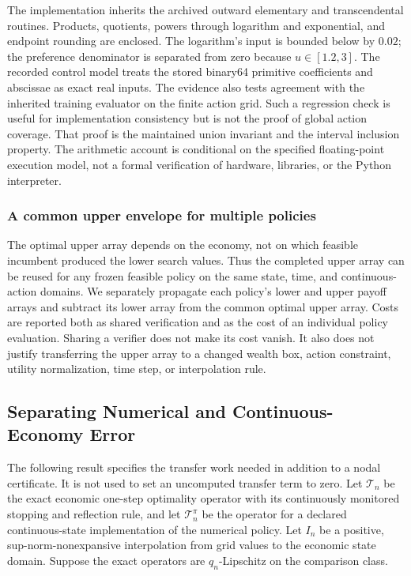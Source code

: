 \documentclass[ecta,nameyear,draft]{econsocart}
\theoremstyle{definition}
\theoremstyle{remark}
\begin{document}
The implementation inherits the archived outward elementary and transcendental routines. Products, quotients, powers through logarithm and exponential, and endpoint rounding are enclosed. The logarithm's input is bounded below by $0.02$; the preference denominator is separated from zero because $u\in[1.2,3]$. The recorded control model treats the stored binary64 primitive coefficients and abscissae as exact real inputs. The evidence also tests agreement with the inherited training evaluator on the finite action grid. Such a regression check is useful for implementation consistency but is not the proof of global action coverage. That proof is the maintained union invariant and the interval inclusion property. The arithmetic account is conditional on the specified floating-point execution model, not a formal verification of hardware, libraries, or the Python interpreter.

\subsubsection{A common upper envelope for multiple policies}
The optimal upper array depends on the economy, not on which feasible incumbent produced the lower search values. Thus the completed upper array can be reused for any frozen feasible policy on the same state, time, and continuous-action domains. We separately propagate each policy's lower and upper payoff arrays and subtract its lower array from the common optimal upper array. Costs are reported both as shared verification and as the cost of an individual policy evaluation. Sharing a verifier does not make its cost vanish. It also does not justify transferring the upper array to a changed wealth box, action constraint, utility normalization, time step, or interpolation rule.

\subsection{Separating Numerical and Continuous-Economy Error}\label{supp:r8-transfer}
The following result specifies the transfer work needed in addition to a nodal certificate. It is not used to set an uncomputed transfer term to zero. Let $\mathcal T_n$ be the exact economic one-step optimality operator with its continuously monitored stopping and reflection rule, and let $\mathcal T_n^{\pi}$ be the operator for a declared continuous-state implementation of the numerical policy. Let $I_n$ be a positive, sup-norm-nonexpansive interpolation from grid values to the economic state domain. Suppose the exact operators are $q_n$-Lipschitz on the comparison class.
\end{document}
